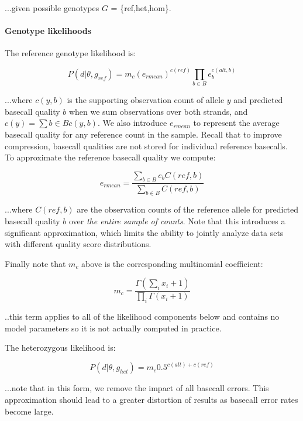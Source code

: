 \documentclass{article}
\begin{document}
...given possible genotypes $G$ = \{ref,het,hom\}.

\paragraph{Genotype likelihoods}

The reference genotype likelihood is:

\begin{equation*}
P ( d \vert \theta, g_{ref}) = m_c (e_{rmean})^{c(ref)} \prod_{b \in B} e_b^{c(alt,b)}
\end{equation*}

...where $c(y,b)$ is the supporting observation count of allele $y$ and predicted basecall quality $b$ when we sum observations over both strands, and $c(y) = \sum{b \in B} c(y,b)$. We also introduce $e_{rmean}$ to represent the average basecall quality for any reference count in the sample. Recall that to improve compression, basecall qualities are not stored for individual reference basecalls. To approximate the reference basecall quality we compute:

\begin{equation*}
e_{rmean} = \frac{\sum_{b \in B} e_b C(ref,b)}{\sum_{b \in B} C(ref,b)}
\end{equation*}

...where $C(ref,b)$ are the observation counts of the reference allele for predicted basecall quality $b$ over \emph{the entire sample of counts}. Note that this introduces a significant approximation, which limits the ability to jointly analyze data sets with different quality score distributions.

Finally note that $m_c$ above is the corresponding multinomial coefficient:

\begin{equation*}
m_c = \frac{\Gamma(\sum_{i}{x_i + 1})}{\prod_{i}{\Gamma(x_i+1)}}
\end{equation*}

..this term applies to all of the likelihood components below and contains no model parameters so it is not actually computed in practice.

The heterozygous likelihood is:

\begin{equation*}
P (d \vert \theta, g_{het}) = m_c 0.5^{c(alt) + c(ref)}
\end{equation*}

...note that in this form, we remove the impact of all basecall errors. This approximation should lead to a greater distortion of results as basecall error rates become large.
\end{document}
